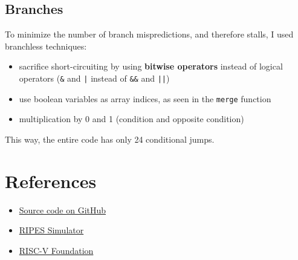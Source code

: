 \documentclass[a4paper,12pt]{article}
\begin{document}
\subsection{Branches}

To minimize the number of branch mispredictions, and therefore stalls, I used branchless techniques:

\begin{itemize}
  \item sacrifice short-circuiting by using \textbf{bitwise operators} instead of logical operators (\texttt{\&} and \texttt{|} instead of \texttt{\&\&} and \texttt{||})
  \item use boolean variables as array indices, as seen in the \texttt{merge} function
  \item multiplication by 0 and 1 (condition and opposite condition)
\end{itemize}

This way, the entire code has only 24 conditional jumps.

\section{References}

\begin{itemize}
    \item \href{https://github.com/Raimo33/LinkedList}{Source code on GitHub}
    \item \href{https://github.com/mortbopet/Ripes}{RIPES Simulator}
    \item \href{https://riscv.org/}{RISC-V Foundation}
\end{itemize}
\end{document}
